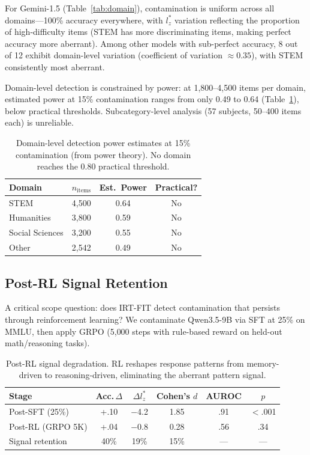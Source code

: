\documentclass[11pt,a4paper]{article}
\begin{document}
For Gemini-1.5 (Table~\ref{tab:domain}), contamination is uniform across all domains---100\% accuracy everywhere, with $l_z^*$ variation reflecting the proportion of high-difficulty items (STEM has more discriminating items, making perfect accuracy more aberrant). Among other models with sub-perfect accuracy, 8 out of 12 exhibit domain-level variation (coefficient of variation $\approx 0.35$), with STEM consistently most aberrant.

Domain-level detection is constrained by power: at 1{,}800--4{,}500 items per domain, estimated power at 15\% contamination ranges from only 0.49 to 0.64 (Table~\ref{tab:domain_power}), below practical thresholds. Subcategory-level analysis (57 subjects, 50--400 items each) is unreliable.

\begin{table}[t]
\centering
\small
\caption{Domain-level detection power estimates at 15\% contamination (from power theory). No domain reaches the 0.80 practical threshold.}
\label{tab:domain_power}
\begin{tabular}{lccc}
\toprule
Domain & $n_{\text{items}}$ & Est.\ Power & Practical? \\
\midrule
STEM & 4{,}500 & 0.64 & No \\
Humanities & 3{,}800 & 0.59 & No \\
Social Sciences & 3{,}200 & 0.55 & No \\
Other & 2{,}542 & 0.49 & No \\
\bottomrule
\end{tabular}
\end{table}


\subsection{Post-RL Signal Retention}
\label{sec:post_rl}

A critical scope question: does IRT-FIT detect contamination that persists through reinforcement learning? We contaminate Qwen3.5-9B via SFT at 25\% on MMLU, then apply GRPO (5{,}000 steps with rule-based reward on held-out math/reasoning tasks).

\begin{table}[t]
\centering
\small
\caption{Post-RL signal degradation. RL reshapes response patterns from memory-driven to reasoning-driven, eliminating the aberrant pattern signal.}
\label{tab:post_rl}
\begin{tabular}{lccccc}
\toprule
Stage & Acc.\,$\Delta$ & $\Delta l_z^*$ & Cohen's $d$ & AUROC & $p$ \\
\midrule
Post-SFT (25\%) & +.10 & $-$4.2 & 1.85 & .91 & $<$.001 \\
Post-RL (GRPO 5K) & +.04 & $-$0.8 & 0.28 & .56 & .34 \\
\midrule
Signal retention & 40\% & 19\% & 15\% & --- & --- \\
\bottomrule
\end{tabular}
\end{table}
\end{document}
